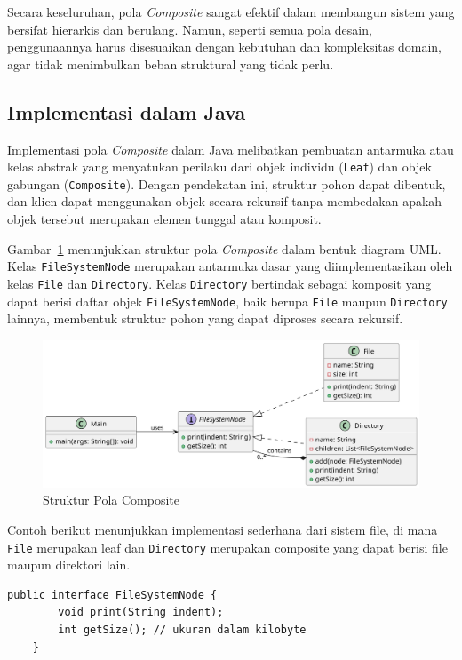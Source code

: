 Secara keseluruhan, pola \textit{Composite} sangat efektif dalam membangun sistem yang bersifat hierarkis dan berulang. Namun, seperti semua pola desain, penggunaannya harus disesuaikan dengan kebutuhan dan kompleksitas domain, agar tidak menimbulkan beban struktural yang tidak perlu.

\subsection{Implementasi dalam Java}

Implementasi pola \textit{Composite} dalam Java melibatkan pembuatan antarmuka atau kelas abstrak yang menyatukan perilaku dari objek individu (\texttt{Leaf}) dan objek gabungan (\texttt{Composite}). Dengan pendekatan ini, struktur pohon dapat dibentuk, dan klien dapat menggunakan objek secara rekursif tanpa membedakan apakah objek tersebut merupakan elemen tunggal atau komposit.

Gambar~\ref{fig:composite} menunjukkan struktur pola \textit{Composite} dalam bentuk diagram UML. Kelas \texttt{FileSystemNode} merupakan antarmuka dasar yang diimplementasikan oleh kelas \texttt{File} dan \texttt{Directory}. Kelas \texttt{Directory} bertindak sebagai komposit yang dapat berisi daftar objek \texttt{FileSystemNode}, baik berupa \texttt{File} maupun \texttt{Directory} lainnya, membentuk struktur pohon yang dapat diproses secara rekursif.

\begin{figure}[h]
	\centering
	\includegraphics[width=\textwidth]{../figures/out/composite.png}
	\caption{Struktur Pola Composite}
	\label{fig:composite}
\end{figure}

Contoh berikut menunjukkan implementasi sederhana dari sistem file, di mana \texttt{File} merupakan leaf dan \texttt{Directory} merupakan composite yang dapat berisi file maupun direktori lain.

\begin{lstlisting}[style=JavaStyle, caption={Component: FileSystemNode}, label={lst:composite-interface}]
	public interface FileSystemNode {
		void print(String indent);
		int getSize(); // ukuran dalam kilobyte
	}
\end{lstlisting}

